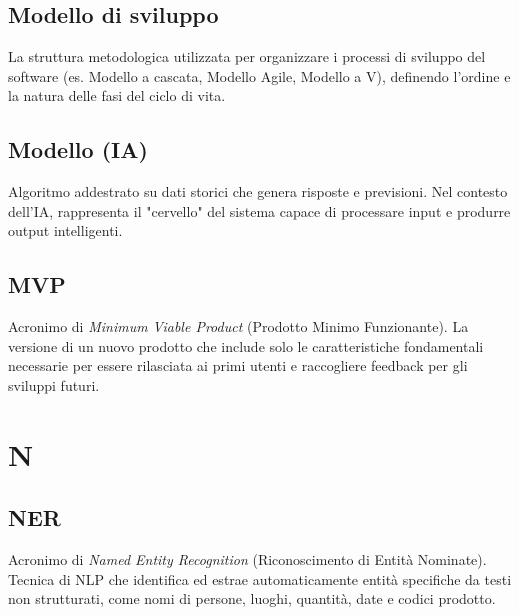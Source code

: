 \documentclass[a4paper, 11pt, oneside]{scrartcl} %
\begin{document}
\subsection*{Modello di sviluppo}
La struttura metodologica utilizzata per organizzare i processi di sviluppo del software (es. Modello a cascata, Modello Agile, Modello a V), definendo l'ordine e la natura delle fasi del ciclo di vita.
\vspace{0.5cm}

\subsection*{Modello (IA)}


Algoritmo addestrato su dati storici che genera risposte e previsioni. Nel contesto dell'IA, rappresenta il "cervello" del sistema capace di processare input e produrre output intelligenti.

\vspace{0.5cm}

\subsection*{MVP}
Acronimo di \textit{Minimum Viable Product} (Prodotto Minimo Funzionante). La versione di un nuovo prodotto che include solo le caratteristiche fondamentali necessarie per essere rilasciata ai primi utenti e raccogliere feedback per gli sviluppi futuri.
\vspace{0.5cm}



\section*{N}


\subsection*{NER}
Acronimo di \textit{Named Entity Recognition} (Riconoscimento di Entità Nominate). Tecnica di NLP che identifica ed estrae automaticamente entità specifiche da testi non strutturati, come nomi di persone, luoghi, quantità, date e codici prodotto.
\vspace{0.5cm}
\end{document}
